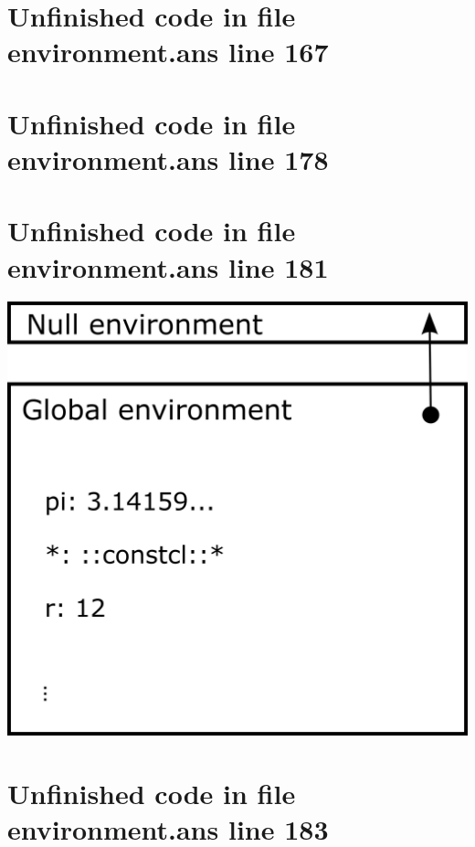 \documentclass[twoside,9pt]{report}
\begin{document}
\section{Unfinished code in file environment.ans line 167}

\section{Unfinished code in file environment.ans line 178}
\section{Unfinished code in file environment.ans line 181}
\includegraphics{images/env1.png}
\section{Unfinished code in file environment.ans line 183}
\end{document}
